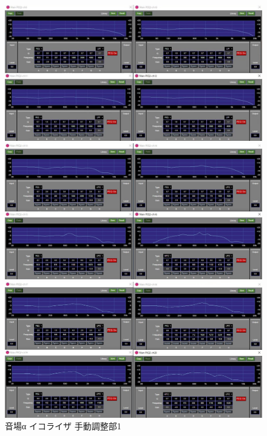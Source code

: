 \documentclass[11pt,a4j]{jreport}
\begin{document}
\begin{figure}[H]
  \begin{minipage}[b]{.5\linewidth}
    \centering
    \includegraphics[width=.9\linewidth]{images/experimentField/afcParameters/01alpha/04manualEQ3.jpg}
  \end{minipage}%
  \begin{minipage}[b]{.5\linewidth}
    \centering
    \includegraphics[width=.9\linewidth]{images/experimentField/afcParameters/01alpha/04manualEQ4.jpg}
  \end{minipage}

  \begin{minipage}[b]{1\linewidth}
    \centering
    \includegraphics[width=.45\linewidth]{images/experimentField/afcParameters/01alpha/04manualEQ5.jpg}
  \end{minipage}

  \centering
  \caption{音場α イコライザ 手動調整部1}
  \label{fig:alphaイコライザ手動調整部1}
\end{figure}
\newpage
\end{document}

